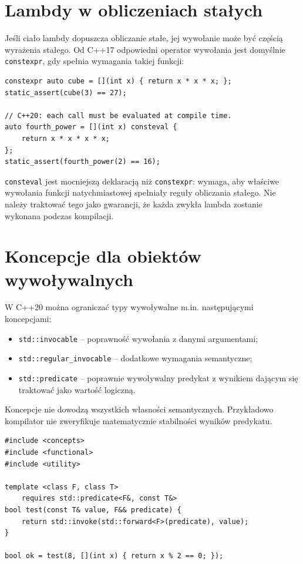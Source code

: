 \section{Lambdy w obliczeniach stałych}

Jeśli ciało lambdy dopuszcza obliczanie stałe, jej wywołanie może
być częścią wyrażenia stałego. Od C++17 odpowiedni operator wywołania
jest domyślnie \texttt{constexpr}, gdy spełnia wymagania takiej funkcji:

\begin{lstlisting}
constexpr auto cube = [](int x) { return x * x * x; };
static_assert(cube(3) == 27);

// C++20: each call must be evaluated at compile time.
auto fourth_power = [](int x) consteval {
    return x * x * x * x;
};
static_assert(fourth_power(2) == 16);
\end{lstlisting}

\texttt{consteval} jest mocniejszą deklaracją niż \texttt{constexpr}:
wymaga, aby właściwe wywołania funkcji natychmiastowej spełniały
reguły obliczania stałego. Nie należy traktować tego jako gwarancji,
że każda zwykła lambda zostanie wykonana podczas kompilacji.

\section{Koncepcje dla obiektów wywoływalnych}
\label{sec:callable-concepts}

W C++20 można ograniczać typy wywoływalne m.in. następującymi
koncepcjami:
\begin{itemize}
\item \texttt{std::invocable} -- poprawność wywołania z danymi argumentami;
\item \texttt{std::regular\_invocable} -- dodatkowe wymagania semantyczne;
\item \texttt{std::predicate} -- poprawnie wywoływalny predykat z
wynikiem dającym się traktować jako wartość logiczną.
\end{itemize}
Koncepcje nie dowodzą wszystkich własności semantycznych. Przykładowo
kompilator nie zweryfikuje matematycznie stabilności wyników predykatu.

\begin{lstlisting}
#include <concepts>
#include <functional>
#include <utility>

template <class F, class T>
    requires std::predicate<F&, const T&>
bool test(const T& value, F&& predicate) {
    return std::invoke(std::forward<F>(predicate), value);
}

bool ok = test(8, [](int x) { return x % 2 == 0; });
\end{lstlisting}

